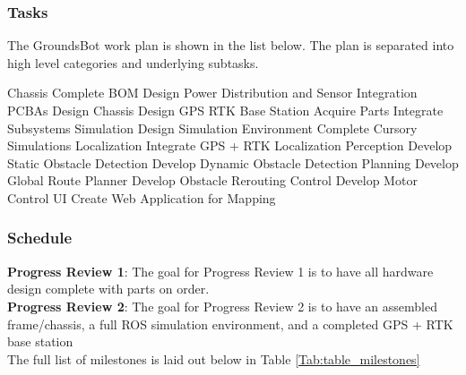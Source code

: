 \documentclass{article}
\begin{document}
\subsubsection{Tasks}
The GroundsBot work plan is shown in the list below.  The plan is separated into high level categories and underlying subtasks. \\
\begin{outline}[enumerate]
  \1 Chassis
    \2 Complete BOM
    \2 Design Power Distribution and Sensor Integration PCBAs
    \2 Design Chassis
    \2 Design GPS RTK Base Station
    \2 Acquire Parts
    \2 Integrate Subsystems
  \1 Simulation
    \2 Design Simulation Environment
    \2 Complete Cursory Simulations
  \1 Localization
    \2 Integrate GPS + RTK Localization
  \1 Perception
    \2 Develop Static Obstacle Detection
    \2 Develop Dynamic Obstacle Detection
  \1 Planning
    \2 Develop Global Route Planner
    \2 Develop Obstacle Rerouting
  \1 Control
    \2 Develop Motor Control
  \1 UI
    \2 Create Web Application for Mapping
\end{outline}

   
\subsubsection{Schedule}
\textbf{Progress Review 1}: The goal for Progress Review 1 is to have all hardware design complete with parts on order. \\
\textbf{Progress Review 2}: The goal for Progress Review 2 is to have an assembled frame/chassis, a full ROS simulation environment, and a completed GPS + RTK base station\\

The full list of milestones is laid out below in Table \ref{Tab:table_milestones}\\ 
\end{document}
